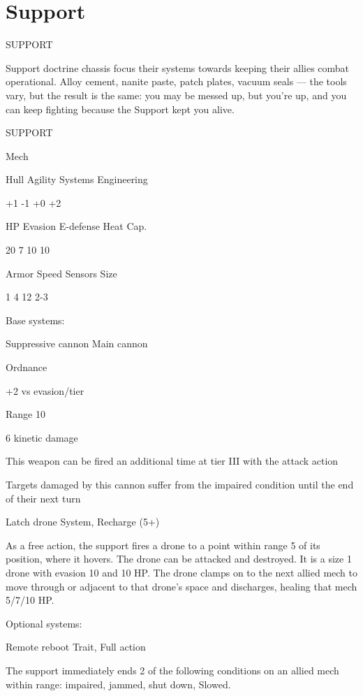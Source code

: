 \section{Support}

                                               SUPPORT

Support doctrine chassis focus their systems towards keeping their allies combat operational.
Alloy cement, nanite paste, patch plates, vacuum seals — the tools vary, but the result is the
same: you may be messed up, but you’re up, and you can keep fighting because the Support
kept you alive.


 SUPPORT

 Mech

 Hull       Agility      Systems       Engineering

 +1         -1           +0            +2

 HP         Evasion      E-defense     Heat Cap.

 20         7            10            10

 Armor      Speed        Sensors       Size

 1          4            12            2-3

Base systems:

Suppressive cannon
Main cannon

Ordnance

+2 vs evasion/tier

Range 10

6 kinetic damage

This weapon can be fired an additional time at tier III with the attack action

Targets damaged by this cannon suffer from the impaired condition until the end of their next
turn


Latch drone
System, Recharge (5+)

As a free action, the support fires a drone to a point within range 5 of its position, where it
hovers. The drone can be attacked and destroyed. It is a size 1 drone with evasion 10 and 10 HP.
The drone clamps on to the next allied mech to move through or adjacent to that drone’s space
and discharges, healing that mech 5/7/10 HP.


Optional systems:

Remote reboot
Trait, Full action





The support immediately ends 2 of the following conditions on an allied mech within range:
impaired, jammed, shut down, Slowed.


